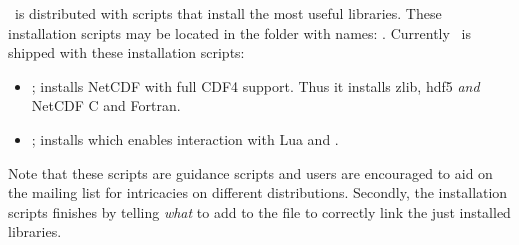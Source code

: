 \siesta\ is distributed with scripts that install the most useful
libraries. These installation scripts may be located in the
 folder with names: .
Currently \siesta\ is shipped with these installation scripts:
\begin{itemize}
  \item {}; installs NetCDF with full CDF4
  support. Thus it installs zlib, hdf5 \emph{and} NetCDF C and
  Fortran.

  \item {}; installs  which
  enables interaction with Lua and \siesta.
  
\end{itemize}
Note that these scripts are guidance scripts and users are encouraged
to aid on the mailing list for intricacies on different
distributions. Secondly, the installation scripts finishes by telling
\emph{what} to add to the  file to correctly link the
just installed libraries.

